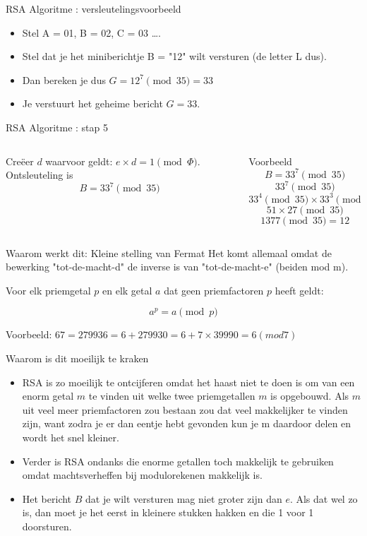 \documentclass{beamer}
\begin{document}
\begin{frame}{RSA Algoritme : versleutelingsvoorbeeld}
	\begin{itemize}
		\item Stel A = 01, B = 02, C = 03 \dots.
		\item Stel dat je het miniberichtje B = "12"  wilt versturen (de letter L dus). 
		\item Dan bereken je dus  $G = 12^7 \pmod{35} = 33$
		\item Je verstuurt  het geheime bericht $G = 33$.	
	\end{itemize}
\end{frame}

\begin{frame}{RSA Algoritme : stap 5}
	\begin{columns}
		\begin{column}[T]{0.5\textwidth}
			Cre\"eer $d$ waarvoor geldt:  $e \times d = 1 \pmod{\Phi}$.
			Ontsleuteling is \[ B = 33^7 \pmod{35}  \]	
	\end{column}
		\begin{column}[T]{0.5\textwidth}
			Voorbeeld
			\[ B = 33^7 \pmod{35} \]
			\[ 33^7 \pmod{35} \]
			\[  33^4 \pmod{35} \times 33^3 \pmod{35} \]
			\[ 51 \times 27 \pmod{35} \]
			\[ 1377 \pmod{35} = 12 \]
		\end{column}
	\end{columns}	
\end{frame}

\begin{frame}{Waarom werkt dit: Kleine stelling van Fermat}
	Het komt allemaal omdat de bewerking "tot-de-macht-d"  de inverse is van "tot-de-macht-e"  (beiden mod m).
	
	
	Voor elk priemgetal $p$ en elk getal $a$ dat geen priemfactoren $p$ heeft geldt:  
	
	\[ a^p  = a \pmod{p} \]
	
	Voorbeeld: $67 = 279936 = 6 + 279930 = 6 + 7 \times 39990 = 6 (mod 7)$
	
\end{frame}

\begin{frame}{Waarom is dit moeilijk te kraken}
	\begin{itemize}
		\item RSA is zo moeilijk te ontcijferen omdat het haast niet te doen is om van een enorm getal $m$ te vinden uit welke twee priemgetallen $m$ is opgebouwd. Als $m$ uit veel meer priemfactoren zou bestaan zou dat veel makkelijker te vinden zijn, want zodra je er dan eentje hebt gevonden kun je m daardoor delen en wordt het snel kleiner.
		\item Verder is RSA ondanks die enorme getallen toch  makkelijk te gebruiken omdat machtsverheffen bij modulorekenen makkelijk is.
		\item 	Het bericht $B$ dat je wilt versturen mag niet groter zijn dan $e$. Als dat wel zo is, dan moet je het eerst in kleinere stukken hakken en die 1 voor 1 doorsturen.
	\end{itemize}


\end{frame}
\end{document}
